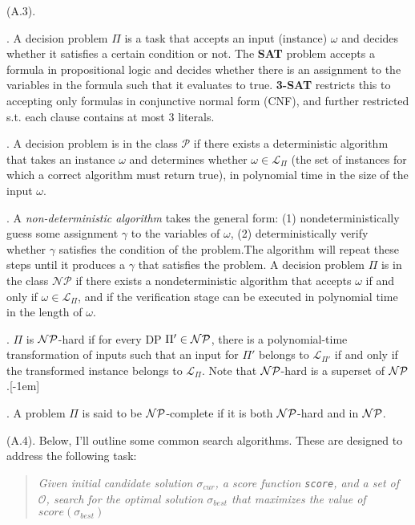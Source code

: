 \documentclass[11pt]{article}
\begin{document}
\myspace 
\p {} (A.3). 
\begin{compactitem}
	\item {}. A decision problem $\Pi$ is a task that accepts an input (instance) $\omega$ and decides whether it satisfies a certain condition or not. The \textbf{SAT} problem accepts a formula in propositional logic and decides whether there is an assignment to the variables in the formula such that it evaluates to true. \textbf{3-SAT} restricts this to accepting only formulas in conjunctive normal form (CNF), and further restricted s.t. each clause contains at most 3 literals. 
	
	\item {}. A decision problem is in the class $\mathcal P$ if there exists a deterministic algorithm that takes an instance $\omega$ and determines whether $\omega \in \mathcal{L}_{\Pi}$ (the set of instances for which a correct algorithm must return true), in polynomial time in the size of the input $\omega$. 
	
	\item {}. A \textit{non-deterministic algorithm} takes the general form: (1) nondeterministically guess some assignment $\gamma$ to the variables of $\omega$, (2) deterministically verify whether $\gamma$ satisfies the condition of the problem.The algorithm will repeat these steps until it produces a $\gamma$ that satisfies the problem. A decision problem $\Pi$ is in the class $\mathcal{N}\mathcal{P}$ if there exists a nondeterministic algorithm that accepts $\omega$ if and only if $\omega \in \mathcal{L}_{\Pi}$, and if the verification stage can be executed in polynomial time in the length of $\omega$.
	
	\item {}. $\Pi$ is $\mathcal{N}\mathcal{P}$-hard if for every DP $\Pi' \in \mathcal{N}\mathcal{P}$, there is a polynomial-time transformation of inputs such that an input for $\Pi'$ belongs to $\mathcal{L}_{\Pi'}$ if and only if the transformed instance belongs to $\mathcal{L}_{\Pi}$. Note that $\mathcal{N}\mathcal{P}$-hard is a superset of $\mathcal{N}\mathcal{P}$.[-1em]
	
	\item {}. A problem $\Pi$ is said to be $\mathcal{N}\mathcal{P}$-complete if it is both $\mathcal{N}\mathcal{P}$-hard and in $\mathcal{N}\mathcal{P}$. 
\end{compactitem}

\myspace{}
\p {} (A.4). Below, I'll outline some common search algorithms. These are designed to address the following task:
\vspace{-0.8em}
\begin{quote}
	{\itshape\small Given initial candidate solution $\sigma_{cur}$, a score function \texttt{score}, and a set of  $\mathcal{O}$, search for the optimal solution $\sigma_{best}$ that maximizes the value of $score(\sigma_{best})$}
\end{quote}
\end{document}
